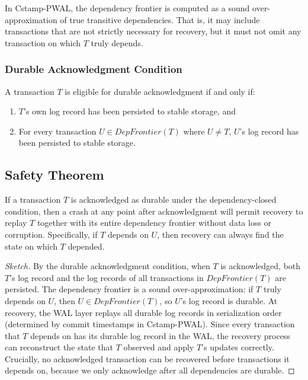 In Cstamp-PWAL, the dependency frontier is computed as a sound
over-approximation of true transitive dependencies.  That is, it may include
transactions that are not strictly necessary for recovery, but it must not omit
any transaction on which $T$ truly depends.

\subsubsection{Durable Acknowledgment Condition}

\begin{definition}
A transaction $T$ is eligible for durable acknowledgment if and only if:
\begin{enumerate}
  \item $T$'s own log record has been persisted to stable storage, and
  \item For every transaction $U \in \mathit{DepFrontier}(T)$ where $U \neq T$,
        $U$'s log record has been persisted to stable storage.
\end{enumerate}
\end{definition}

\subsection{Safety Theorem}
\label{sec:correctness-theorem}

\begin{theorem}
If a transaction $T$ is acknowledged as durable under the dependency-closed
condition, then a crash at any point after acknowledgment will permit recovery
to replay $T$ together with its entire dependency frontier without data loss or
corruption.  Specifically, if $T$ depends on $U$, then recovery can always find
the state on which $T$ depended.
\end{theorem}

\begin{proof}[Sketch]
By the durable acknowledgment condition, when $T$ is acknowledged, both $T$'s
log record and the log records of all transactions in $\mathit{DepFrontier}(T)$
are persisted.  The dependency frontier is a sound over-approximation: if $T$
truly depends on $U$, then $U \in \mathit{DepFrontier}(T)$, so $U$'s log record
is durable.  At recovery, the WAL layer replays all durable log records in
serialization order (determined by commit timestamps in Cstamp-PWAL).  Since
every transaction that $T$ depends on has its durable log record in the WAL, the
recovery process can reconstruct the state that $T$ observed and apply $T$'s
updates correctly.  Crucially, no acknowledged transaction can be recovered
before transactions it depends on, because we only acknowledge after all
dependencies are durable.
\end{proof}

